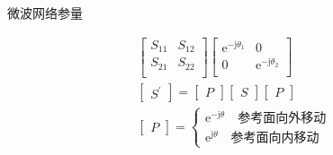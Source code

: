 \begin{frame}{微波网络参量}
\begin{enumerate}
\begin{gather*}
                  \begin{bmatrix*}
                      S_{11} & S_{12} \\
                      S_{21} & S_{22} \\
                  \end{bmatrix*}
                  \begin{bmatrix*}
                      \mathrm{e}^{-\mathrm{j}\theta_1} & 0 \\
                      0 & \mathrm{e}^{-\mathrm{j}\theta_2} \\
                  \end{bmatrix*}\\
                  \begin{bmatrix*}
                      S^{'}
                  \end{bmatrix*}
                  =
                  \begin{bmatrix*}
                      P
                  \end{bmatrix*}
                  \begin{bmatrix*}
                      S
                  \end{bmatrix*}
                  \begin{bmatrix*}
                      P
                  \end{bmatrix*}\\
                  \begin{bmatrix*}
                      P
                  \end{bmatrix*}
                  =
                  \begin{cases}
                      \mathrm{e}^{-\mathrm{j}\theta} \quad \text{参考面向外移动} \\
                      \mathrm{e}^{\mathrm{j}\theta} \quad \text{参考面向内移动}
                  \end{cases}
              \end{gather*}
    \end{enumerate}
\end{frame}

